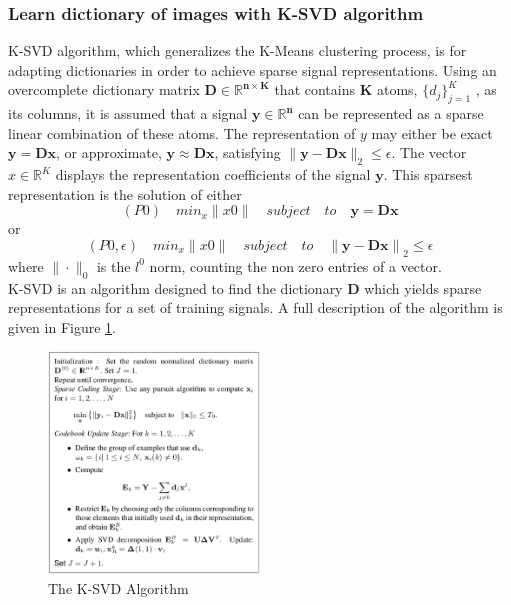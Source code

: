 \subsubsection{Learn dictionary of images with K-SVD algorithm}
K-SVD \cite{ksvd}algorithm, which generalizes the K-Means clustering process, is for adapting dictionaries in order to achieve sparse signal representations. Using an overcomplete dictionary matrix $\mathbf{D \in \mathbb{R}^{n\times K} }$ that contains $\mathbf{K}$ atoms, $\{d_j\}_{j = 1}^K $ , as its columns, it is assumed that a signal $\mathbf{y \in \mathbb{R}^n}$ can be represented as a sparse linear combination of these atoms. The representation of $y$ may either be exact $\mathbf{y = Dx}$, or approximate, $\mathbf{y} \approx \mathbf{Dx}$, satisfying $\|\mathbf{y - Dx}\|_2 \leq \epsilon$. The vector $x \in \mathbb{R}^K$ displays the representation coefficients of the signal $\mathbf{y}$. This sparsest representation is the solution of either 
\begin{equation}
(P0 )\quad    min_x\|x0\|\quad subject\quad to \quad\mathbf{y = Dx}
\end{equation}
 or 
\begin{equation}
(P0, \epsilon)\quad    min_x\|x0\| \quad  subject\quad  to \quad \mathbf{\|y - Dx\|}_2 \leq \epsilon
\end{equation}
where $\|\cdot\|_0$ is the $l^0$ norm, counting the non zero entries of a vector.\\

K-SVD is an algorithm designed to find the dictionary $\mathbf{D}$ which yields sparse representations for a set of training signals. A full description of the algorithm is given in Figure \ref{fig:ksvd}.\\
\begin{figure}
  \centering
  \includegraphics[width=0.5\textwidth]{KSVD}
  \caption{The K-SVD Algorithm}
  \label{fig:ksvd}
\end{figure}


